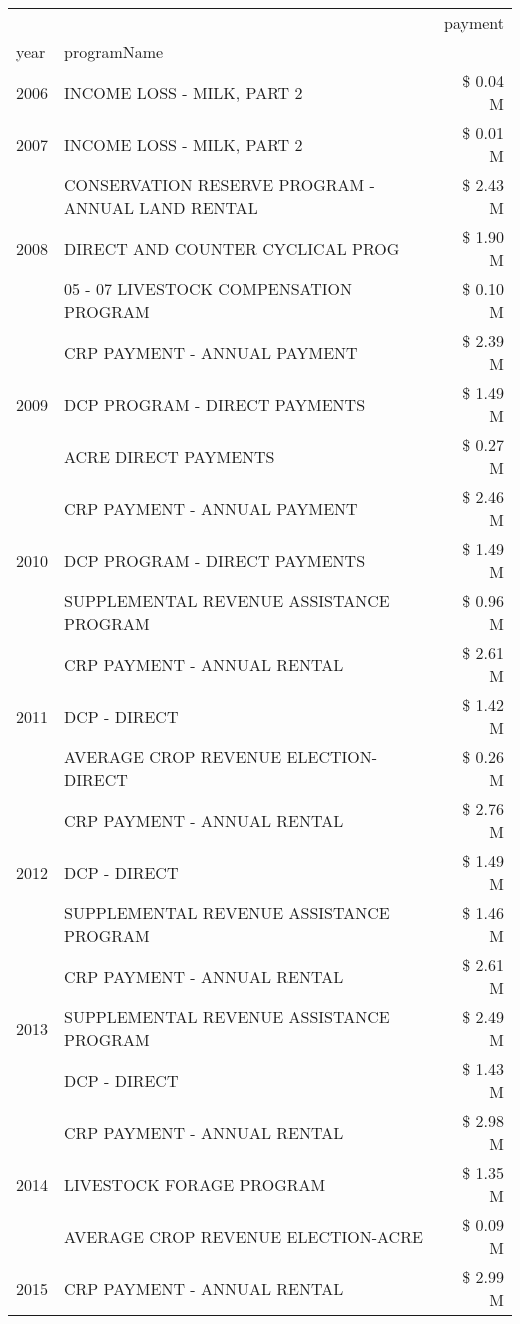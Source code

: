 \begin{tabular}{llr}
\toprule
 &  & payment \\
year & programName &  \\
\midrule
2006 & INCOME LOSS - MILK, PART 2 & \$ 0.04 M \\
\cline{1-3}
2007 & INCOME LOSS - MILK, PART 2 & \$ 0.01 M \\
\cline{1-3}
\multirow[t]{3}{*}{2008} & CONSERVATION RESERVE PROGRAM - ANNUAL LAND RENTAL & \$ 2.43 M \\
 & DIRECT AND COUNTER CYCLICAL PROG & \$ 1.90 M \\
 & 05 - 07 LIVESTOCK COMPENSATION PROGRAM & \$ 0.10 M \\
\cline{1-3}
\multirow[t]{3}{*}{2009} & CRP PAYMENT - ANNUAL PAYMENT & \$ 2.39 M \\
 & DCP PROGRAM - DIRECT PAYMENTS & \$ 1.49 M \\
 & ACRE DIRECT PAYMENTS & \$ 0.27 M \\
\cline{1-3}
\multirow[t]{3}{*}{2010} & CRP PAYMENT - ANNUAL PAYMENT & \$ 2.46 M \\
 & DCP PROGRAM - DIRECT PAYMENTS & \$ 1.49 M \\
 & SUPPLEMENTAL REVENUE ASSISTANCE PROGRAM & \$ 0.96 M \\
\cline{1-3}
\multirow[t]{3}{*}{2011} & CRP PAYMENT - ANNUAL RENTAL & \$ 2.61 M \\
 & DCP - DIRECT & \$ 1.42 M \\
 & AVERAGE CROP REVENUE ELECTION-DIRECT & \$ 0.26 M \\
\cline{1-3}
\multirow[t]{3}{*}{2012} & CRP PAYMENT - ANNUAL RENTAL & \$ 2.76 M \\
 & DCP - DIRECT & \$ 1.49 M \\
 & SUPPLEMENTAL REVENUE ASSISTANCE PROGRAM & \$ 1.46 M \\
\cline{1-3}
\multirow[t]{3}{*}{2013} & CRP PAYMENT - ANNUAL RENTAL & \$ 2.61 M \\
 & SUPPLEMENTAL REVENUE ASSISTANCE PROGRAM & \$ 2.49 M \\
 & DCP - DIRECT & \$ 1.43 M \\
\cline{1-3}
\multirow[t]{3}{*}{2014} & CRP PAYMENT - ANNUAL RENTAL & \$ 2.98 M \\
 & LIVESTOCK FORAGE PROGRAM & \$ 1.35 M \\
 & AVERAGE CROP REVENUE ELECTION-ACRE & \$ 0.09 M \\
\cline{1-3}
\multirow[t]{3}{*}{2015} & CRP PAYMENT - ANNUAL RENTAL & \$ 2.99 M \\

\end{tabular}

